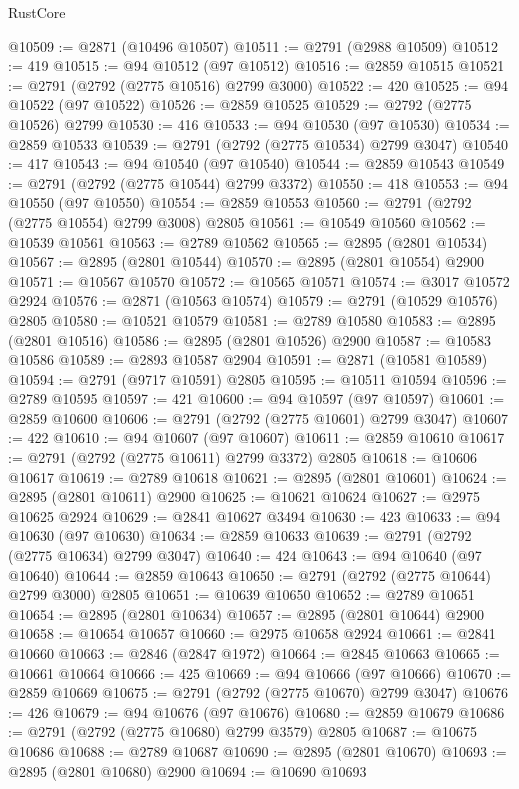 \begin{lexlean}{RustCore}
\begin{coremodule}
@10509 := @2871 (@10496 @10507)
@10511 := @2791 (@2988 @10509)
@10512 := 419
@10515 := @94 @10512 (@97 @10512)
@10516 := @2859 @10515
@10521 := @2791 (@2792 (@2775 @10516) @2799 @3000)
@10522 := 420
@10525 := @94 @10522 (@97 @10522)
@10526 := @2859 @10525
@10529 := @2792 (@2775 @10526) @2799
@10530 := 416
@10533 := @94 @10530 (@97 @10530)
@10534 := @2859 @10533
@10539 := @2791 (@2792 (@2775 @10534) @2799 @3047)
@10540 := 417
@10543 := @94 @10540 (@97 @10540)
@10544 := @2859 @10543
@10549 := @2791 (@2792 (@2775 @10544) @2799 @3372)
@10550 := 418
@10553 := @94 @10550 (@97 @10550)
@10554 := @2859 @10553
@10560 := @2791 (@2792 (@2775 @10554) @2799 @3008) @2805
@10561 := @10549 @10560
@10562 := @10539 @10561
@10563 := @2789 @10562
@10565 := @2895 (@2801 @10534)
@10567 := @2895 (@2801 @10544)
@10570 := @2895 (@2801 @10554) @2900
@10571 := @10567 @10570
@10572 := @10565 @10571
@10574 := @3017 @10572 @2924
@10576 := @2871 (@10563 @10574)
@10579 := @2791 (@10529 @10576) @2805
@10580 := @10521 @10579
@10581 := @2789 @10580
@10583 := @2895 (@2801 @10516)
@10586 := @2895 (@2801 @10526) @2900
@10587 := @10583 @10586
@10589 := @2893 @10587 @2904
@10591 := @2871 (@10581 @10589)
@10594 := @2791 (@9717 @10591) @2805
@10595 := @10511 @10594
@10596 := @2789 @10595
@10597 := 421
@10600 := @94 @10597 (@97 @10597)
@10601 := @2859 @10600
@10606 := @2791 (@2792 (@2775 @10601) @2799 @3047)
@10607 := 422
@10610 := @94 @10607 (@97 @10607)
@10611 := @2859 @10610
@10617 := @2791 (@2792 (@2775 @10611) @2799 @3372) @2805
@10618 := @10606 @10617
@10619 := @2789 @10618
@10621 := @2895 (@2801 @10601)
@10624 := @2895 (@2801 @10611) @2900
@10625 := @10621 @10624
@10627 := @2975 @10625 @2924
@10629 := @2841 @10627 @3494
@10630 := 423
@10633 := @94 @10630 (@97 @10630)
@10634 := @2859 @10633
@10639 := @2791 (@2792 (@2775 @10634) @2799 @3047)
@10640 := 424
@10643 := @94 @10640 (@97 @10640)
@10644 := @2859 @10643
@10650 := @2791 (@2792 (@2775 @10644) @2799 @3000) @2805
@10651 := @10639 @10650
@10652 := @2789 @10651
@10654 := @2895 (@2801 @10634)
@10657 := @2895 (@2801 @10644) @2900
@10658 := @10654 @10657
@10660 := @2975 @10658 @2924
@10661 := @2841 @10660
@10663 := @2846 (@2847 @1972)
@10664 := @2845 @10663
@10665 := @10661 @10664
@10666 := 425
@10669 := @94 @10666 (@97 @10666)
@10670 := @2859 @10669
@10675 := @2791 (@2792 (@2775 @10670) @2799 @3047)
@10676 := 426
@10679 := @94 @10676 (@97 @10676)
@10680 := @2859 @10679
@10686 := @2791 (@2792 (@2775 @10680) @2799 @3579) @2805
@10687 := @10675 @10686
@10688 := @2789 @10687
@10690 := @2895 (@2801 @10670)
@10693 := @2895 (@2801 @10680) @2900
@10694 := @10690 @10693

\end{coremodule}
\end{lexlean}
